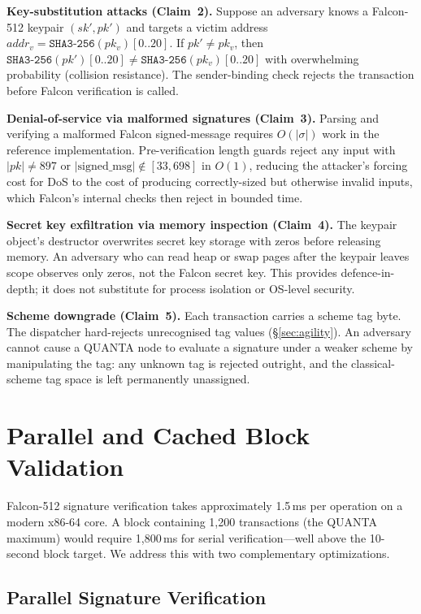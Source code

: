 \documentclass[11pt,a4paper]{article}
\begin{document}
\noindent\textbf{Key-substitution attacks (Claim~2).}
Suppose an adversary knows a Falcon-512 keypair $(sk', pk')$ and targets
a victim address $\mathit{addr}_v = \texttt{SHA3-256}(pk_v)[0..20]$.
If $pk' \neq pk_v$, then
$\texttt{SHA3-256}(pk')[0..20] \neq \texttt{SHA3-256}(pk_v)[0..20]$
with overwhelming probability (collision resistance). The sender-binding check
rejects the transaction before Falcon verification is called.

\noindent\textbf{Denial-of-service via malformed signatures (Claim~3).}
Parsing and verifying a malformed Falcon signed-message requires $O(|\sigma|)$
work in the reference implementation. Pre-verification length guards reject
any input with $|pk| \neq 897$ or $|\text{signed\_msg}| \notin [33, 698]$
in $O(1)$, reducing the attacker's forcing cost for DoS to the cost of
producing correctly-sized but otherwise invalid inputs, which Falcon's
internal checks then reject in bounded time.

\noindent\textbf{Secret key exfiltration via memory inspection (Claim~4).}
The keypair object's destructor overwrites secret key storage with zeros
before releasing memory. An adversary who can read heap or swap pages after
the keypair leaves scope observes only zeros, not the Falcon secret key.
This provides defence-in-depth; it does not substitute for process isolation
or OS-level security.

\noindent\textbf{Scheme downgrade (Claim~5).}
Each transaction carries a scheme tag byte. The dispatcher hard-rejects
unrecognised tag values (\S\ref{sec:agility}). An adversary cannot cause
a QUANTA node to evaluate a signature under a weaker scheme by manipulating
the tag: any unknown tag is rejected outright, and the classical-scheme tag
space is left permanently unassigned.

\section{Parallel and Cached Block Validation}
\label{sec:parallel}

Falcon-512 signature verification takes approximately 1.5\,ms per operation on
a modern x86-64 core. A block containing 1,200 transactions (the QUANTA
maximum) would require 1,800\,ms for serial verification---well above the
10-second block target. We address this with two complementary optimizations.

\subsection{Parallel Signature Verification}
\end{document}
